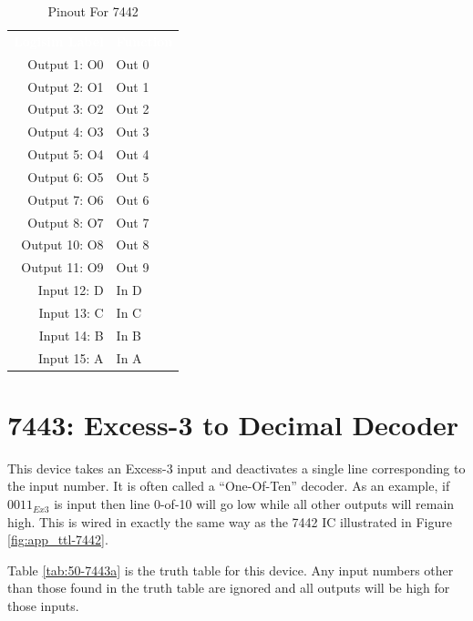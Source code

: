 \begin{table}[H]
	\sffamily
	\newcommand{\head}[1]{\textcolor{white}{\textbf{#1}}}		
	\begin{center}
		\begin{tabular}{rl} 
			\rowcolor{black!75}
			\head{Logisim Label} & \head{Function} \\
			Output 1: O0  & Out 0 \\
			Output 2: O1  & Out 1 \\
			Output 3: O2  & Out 2 \\
			Output 4: O3  & Out 3 \\
			Output 5: O4  & Out 4 \\
			Output 6: O5  & Out 5 \\
			Output 7: O6  & Out 6 \\
			Output 8: O7  & Out 7 \\
			Output 10: O8 & Out 8 \\
			Output 11: O9 & Out 9 \\
			Input 12: D   & In D  \\
			Input 13: C   & In C  \\
			Input 14: B   & In B  \\
			Input 15: A   & In A  \\
		\end{tabular}
	\end{center}
	\caption{Pinout For 7442}
	\label{tab:50-7442b}
\end{table}

\section{7443: Excess-3 to Decimal Decoder}

This device takes an Excess-3 input and deactivates a single line corresponding to the input number. It is often called a ``One-Of-Ten'' decoder. As an example, if $ 0011_{Ex3} $ is input then line 0-of-10 will go low while all other outputs will remain high. This is wired in exactly the same way as the 7442 \ac{IC} illustrated in Figure \ref{fig:app_ttl-7442}.

Table \ref{tab:50-7443a} is the truth table for this device. Any input numbers other than those found in the truth table are ignored and all outputs will be high for those inputs.

